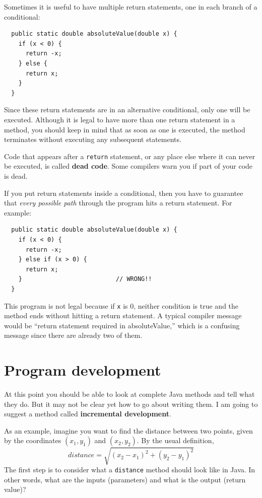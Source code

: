 \documentclass[12pt]{book}
\theoremstyle{exercise}
\begin{document}
Sometimes it is useful to have multiple return
statements, one in each branch of a conditional:

\begin{lstlisting}
  public static double absoluteValue(double x) {
    if (x < 0) {
      return -x;
    } else {
      return x;
    }
  }
\end{lstlisting}
%
Since these return statements are in an alternative conditional,
only one will be executed.  Although it is legal to have more than one
return statement in a method, you should keep in mind
that as soon as one is executed, the method
terminates without executing any subsequent statements.

Code that appears after a {\tt return} statement, or any place else
where it can never be executed, is called {\bf dead code}.  Some
compilers warn you if part of your code is dead.


If you put return statements inside a conditional, then
you have to guarantee that {\em every possible path} through
the program hits a return statement.  For example:

\begin{lstlisting}
  public static double absoluteValue(double x) {
    if (x < 0) {
      return -x;
    } else if (x > 0) {
      return x;
    }                          // WRONG!!
  }
\end{lstlisting}
%
This program is not legal because if {\tt x} is 0,
neither condition is true and the method ends without hitting
a return statement.  A typical compiler message would be ``return
statement required in absoluteValue,'' which is a confusing message
since there are already two of them.


\section{Program development}
\label{distance}

At this point you should be able to look at complete Java methods and
tell what they do.  But it may not be clear yet how to go about
writing them.  I am going to suggest a method called {\bf incremental
  development}.

As an example, imagine you want to find the distance between
two points, given by the coordinates $(x_1, y_1)$ and
$(x_2, y_2)$.  By the usual definition,
%
\begin{equation*}
distance = \sqrt{(x_2 - x_1)^2 +(y_2 - y_1)^2}
\end{equation*}
%
The first step is to consider what a {\tt distance} method
should look like in Java.  In other words, what are the inputs
(parameters) and what is the output (return value)?
\end{document}
